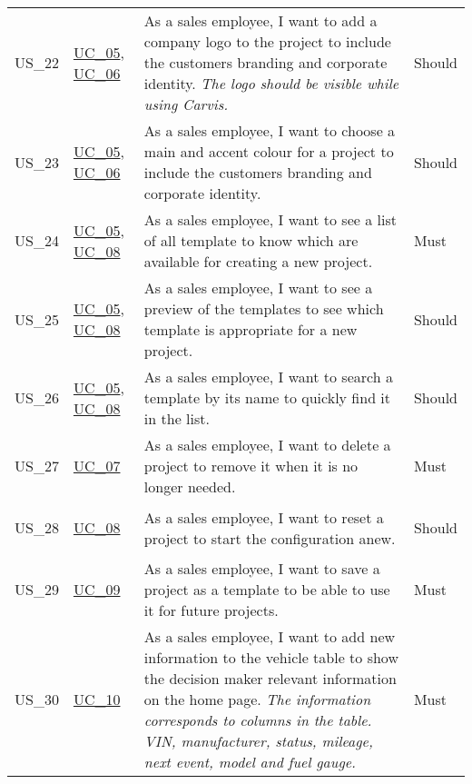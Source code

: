 \begin{footnotesize}
\begin{longtable}[L L L L]{ p{} p{} p{} p{} }
      \hypertarget{Ref:US22}{US\_22} & \hyperlink{Ref:UC5}{UC\_05}, \newline \hyperlink{Ref:UC6}{UC\_06} & As a sales employee, I want to add a company logo to the project to include the customers branding and corporate identity. 
      \newline
      \emph{The logo should be visible while using Carvis.} & Should
      \\
      \hypertarget{Ref:US23}{US\_23} & \hyperlink{Ref:UC5}{UC\_05}, \newline \hyperlink{Ref:UC6}{UC\_06} & As a sales employee, I want to choose a main and accent colour for a project to include the customers branding and corporate identity. & Should \\
      \hypertarget{Ref:US24}{US\_24} & \hyperlink{Ref:UC5}{UC\_05}, \newline \hyperlink{Ref:UC8}{UC\_08} & As a sales employee, I want to see a list of all template to know which are available for creating a new project. & Must \\
      \hypertarget{Ref:US25}{US\_25} & \hyperlink{Ref:UC5}{UC\_05}, \newline \hyperlink{Ref:UC8}{UC\_08} & As a sales employee, I want to see a preview of the templates to see which template is appropriate for a new project. & Should \\
      \hypertarget{Ref:US26}{US\_26} & \hyperlink{Ref:UC5}{UC\_05}, \newline \hyperlink{Ref:UC8}{UC\_08} & As a sales employee, I want to search a template by its name to quickly find it in the list. & Should \\
      \hypertarget{Ref:US27}{US\_27} & \hyperlink{Ref:UC7}{UC\_07} & As a sales employee, I want to delete a project to remove it when it is no longer needed. & Must \\
      \hypertarget{Ref:US28}{US\_28} & \hyperlink{Ref:UC8}{UC\_08} & As a sales employee, I want to reset a project to start the configuration anew. & Should \\
      \hypertarget{Ref:US29}{US\_29} & \hyperlink{Ref:UC9}{UC\_09} & As a sales employee, I want to save a project as a template to be able to use it for future projects. & Must \\
      \hypertarget{Ref:US30}{US\_30} & \hyperlink{Ref:UC10}{UC\_10} & As a sales employee, I want to add new information to the vehicle table to show the decision maker relevant information on the home page.
      \newline
      \emph{The information corresponds to columns in the table. VIN, manufacturer, status, mileage, next event, model and fuel gauge.} & Must  \\

\end{longtable}
\end{footnotesize}
